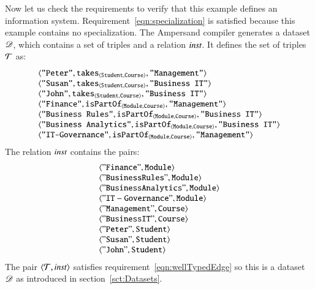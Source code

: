 \documentclass{elsarticle}
\begin{document}
   Now let us check the requirements to verify that this example defines an information system.
   Requirement~\ref{eqn:specialization} is satisfied because this example contains no specialization.
   The Ampersand compiler generates a dataset $\mathscr{D}$, which contains a set of triples and a relation $\mathbin{\text{\it inst\/}}$.
   It defines the set of triples $\mathcal{T}$ as:
   \[\begin{array}[t]{l}
         \langle{\text{\tt "Peter"}},{\text{\it \text{\tt takes}\/}_{\langle{\text{\tt Student}},{\text{\tt Course}}\rangle}},{\text{\tt "Management"}}\rangle\\
         \langle{\text{\tt "Susan"}},{\text{\it \text{\tt takes}\/}_{\langle{\text{\tt Student}},{\text{\tt Course}}\rangle}},{\text{\tt "Business IT"}}\rangle\\
         \langle{\text{\tt "John"}},{\text{\it \text{\tt takes}\/}_{\langle{\text{\tt Student}},{\text{\tt Course}}\rangle}},{\text{\tt "Business IT"}}\rangle\\
         \langle{\text{\tt "Finance"}},{\text{\it \text{\tt isPartOf}\/}_{\langle{\text{\tt Module}},{\text{\tt Course}}\rangle}},{\text{\tt "Management"}}\rangle\\
         \langle{\text{\tt "Business Rules"}},{\text{\it \text{\tt isPartOf}\/}_{\langle{\text{\tt Module}},{\text{\tt Course}}\rangle}},{\text{\tt "Business IT"}}\rangle\\
         \langle{\text{\tt "Business Analytics"}},{\text{\it \text{\tt isPartOf}\/}_{\langle{\text{\tt Module}},{\text{\tt Course}}\rangle}},{\text{\tt "Business IT"}}\rangle\\
         \langle{\text{\tt "IT-Governance"}},{\text{\it \text{\tt isPartOf}\/}_{\langle{\text{\tt Module}},{\text{\tt Course}}\rangle}},{\text{\tt "Management"}}\rangle
   \end{array}\]
   The relation $\mathbin{\text{\it inst\/}}$ contains the pairs:
   \[\begin{array}{l}
      \langle{\tt "Finance"},{\tt Module}\rangle\\
      \langle{\tt "Business Rules"},{\tt Module}\rangle\\
      \langle{\tt "Business Analytics"},{\tt Module}\rangle\\
      \langle{\tt "IT-Governance"},{\tt Module}\rangle\\
      \langle{\tt "Management"},{\tt Course}\rangle\\
      \langle{\tt "Business IT"},{\tt Course}\rangle\\
      \langle{\tt "Peter"},{\tt Student}\rangle\\
      \langle{\tt "Susan"},{\tt Student}\rangle\\
      \langle{\tt "John"},{\tt Student}\rangle
   \end{array}\]
   The pair $\langle{\mathcal{T}},{\mathbin{\text{\it inst\/}}}\rangle$ satisfies requirement~\ref{eqn:wellTypedEdge} so this is a dataset $\mathscr{D}$ as introduced in section~\ref{sct:Datasets}.
\end{document}
